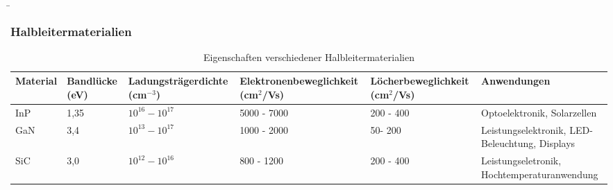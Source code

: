 \begin{frame}
    \b{
        \frametitle{Halbleitermaterialien}
        \begin{table}[H]
            \centering
            \begin{tabular}{|p{1.6cm}|p{1.1cm}|p{2cm}|p{2.2cm}|p{2.2cm}|p{2.4cm}|}
                \hline
                \textbf{Material} & \textbf{Band\-lücke \newline (eV)} & \textbf{Ladungs\-trägerdichte \newline (cm$^{-3}$)} & \textbf{Elektronen\-beweglichkeit \newline (cm$^2$/Vs)} & \textbf{Löcher\-beweglichkeit \newline (cm$^2$/Vs)} & \textbf{Anwendungen}   \\
                \hline
                InP               & 1,35                                        & $10^{16} - 10^{17}$                                          & 5000 - 7000                                                      & 200 - 400                                                    & Optoelektro\-nik, Solar\-zellen \\
                \hline
                GaN               & 3,4                                         & $10^{13} - 10^{17}$                                          & 1000 - 2000                                                      & 50- 200                                                      & Leistungs\-elektronik, LED-Beleuch\-tung, Displays \\
                \hline
                SiC               & 3,0                                         & $10^{12} - 10^{16}$                                          & 800 - 1200                                                       & 200 - 400                                                    & Leistungs\-eletronik, Hoch\-tem\-peratur\-an\-wen\-dung \\
                \hline
            \end{tabular}
            \caption{Eigenschaften verschiedener Halbleitermaterialien}
        \end{table}
    }
\end{frame}

